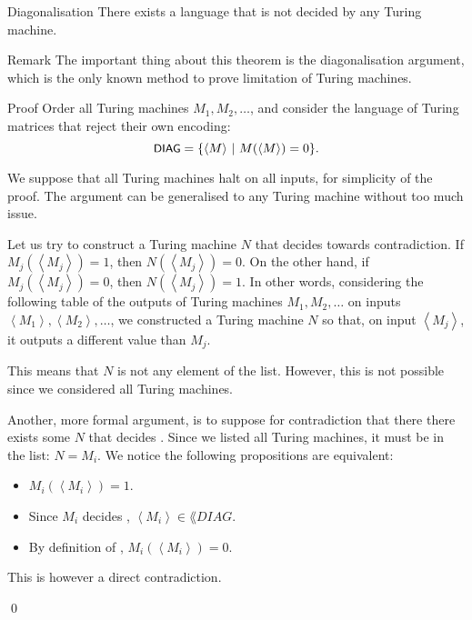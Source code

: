 \documentclass[a4paper]{article}
\begin{document}
\begin{parag}{Diagonalisation}
    There exists a language that is not decided by any Turing machine.

    \begin{subparag}{Remark}
        The important thing about this theorem is the diagonalisation argument, which is the only known method to prove limitation of Turing machines.
    \end{subparag}

    \begin{subparag}{Proof}
        Order all Turing machines $M_1, M_2, \ldots$, and consider the language of Turing matrices that reject their own encoding: 
        \[\lang{DIAG} = \left\{\left\langle M \right\rangle \suchthat M\left(\left\langle M \right\rangle\right) = 0\right\}.\]

        We suppose that all Turing machines halt on all inputs, for simplicity of the proof. The argument can be generalised to any Turing machine without too much issue.

        Let us try to construct a Turing machine $N$ that decides  towards contradiction. If $M_j\left(\left\langle M_j \right\rangle\right) = 1$, then $N\left(\left\langle M_j \right\rangle\right) = 0$. On the other hand, if $M_j\left(\left\langle M_j \right\rangle\right) = 0$, then $N\left(\left\langle M_j \right\rangle\right) = 1$. In other words, considering the following table of the outputs of Turing machines $M_1, M_2, \ldots$ on inputs $\left\langle M_1 \right\rangle, \left\langle M_2 \right\rangle, \ldots$, we constructed a Turing machine $N$ so that, on input $\left\langle M_j \right\rangle$, it outputs a different value than $M_j$.

        This means that $N$ is not any element of the list. However, this is not possible since we considered all Turing machines.

        Another, more formal argument, is to suppose for contradiction that there there exists some $N$ that decides . Since we listed all Turing machines, it must be in the list: $N = M_i$. We notice the following propositions are equivalent:
        \begin{itemize}
            \item $M_i\left(\left\langle M_i \right\rangle\right) = 1$.
            \item Since $M_i$ decides , $\left\langle M_i \right\rangle \in \lang{DIAG}$.
            \item By definition of , $M_i\left(\left\langle M_i \right\rangle\right) = 0$.
        \end{itemize}

        This is however a direct contradiction. 

        \qed
    \end{subparag}
\end{parag}
\end{document}
